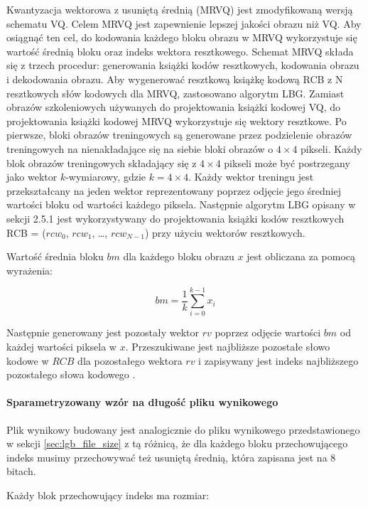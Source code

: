 \documentclass{article}
\begin{document}
Kwantyzacja wektorowa z usuniętą średnią (MRVQ) jest zmodyfikowaną wersją schematu VQ. 
Celem MRVQ jest zapewnienie lepszej jakości obrazu niż VQ. 
Aby osiągnąć ten cel, do kodowania każdego bloku obrazu w MRVQ wykorzystuje się wartość średnią bloku oraz indeks wektora resztkowego. 
Schemat MRVQ składa się z trzech procedur: generowania książki kodów resztkowych, kodowania obrazu i dekodowania obrazu.
Aby wygenerować resztkową książkę kodową RCB z N resztkowych słów kodowych dla MRVQ, zastosowano algorytm LBG. 
Zamiast obrazów szkoleniowych używanych do projektowania książki kodowej VQ, do projektowania książki kodowej MRVQ wykorzystuje się wektory resztkowe. 
Po pierwsze, bloki obrazów treningowych są generowane przez podzielenie obrazów treningowych na nienakładające się 
na siebie bloki obrazów o $4 \times 4$ pikseli. 
Każdy blok obrazów treningowych składający się z $4 \times 4$ pikseli może być postrzegany jako wektor $k$-wymiarowy, gdzie $k=4 \times 4$. 
Każdy wektor treningu jest przekształcany na jeden wektor reprezentowany poprzez odjęcie jego średniej wartości bloku od wartości każdego piksela. 
Następnie algorytm LBG opisany w sekcji 2.5.1 jest wykorzystywany do projektowania książki 
kodów resztkowych RCB = ($rcw_{0}$, $rcw_{1}$, \dots, $rcw_{N-1}$) przy użyciu wektorów resztkowych.

Wartość średnia bloku $bm$ dla każdego bloku obrazu $x$ jest obliczana za pomocą wyrażenia: 

\begin{equation}
bm = \frac{1}{k} \sum_{i=0}^{k-1} x_{i}
\end{equation}

Następnie generowany jest pozostały wektor $rv$ poprzez odjęcie wartości $bm$ od każdej wartości piksela w $x$.
Przeszukiwane jest najbliższe pozostałe słowo kodowe w $RCB$ dla pozostałego wektora $rv$ i zapisywany jest indeks
najbliższego pozostałego słowa kodowego \cite{meanremovedVQ}. 

\paragraph{Sparametryzowany wzór na długość pliku wynikowego}

Plik wynikowy budowany jest analogicznie do pliku wynikowego przedstawionego w sekcji \ref{sec:lgb_file_size} z tą różnicą, że dla każdego bloku przechowującego indeks musimy przechowywać też usuniętą średnią, która zapisana jest na $8$ bitach.

Każdy blok przechowujący indeks ma rozmiar:
\end{document}

